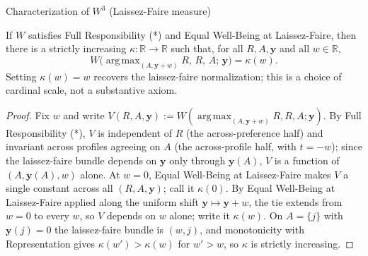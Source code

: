 \documentclass[10pt]{beamer}
\DeclareMathOperator*{\argmax}{arg\,max}
\begin{document}
\begin{frame}[allowframebreaks]{Characterization of $W^3$ (Laissez-Faire measure)}
\framebreak

\begin{lemma}
If $W$ satisfies Full Responsibility (*) and Equal Well-Being at Laissez-Faire,
then there is a strictly
increasing $\kappa:\mathbb R\to\mathbb R$ such that, for all $R,A,\mathbf y$ and
all $w\in\mathbb R$,
\begin{equation*}
W\!\big(\argmax_{(A,\mathbf y+w)}R,\,R,\,A;\,\mathbf y\big)=\kappa(w).
\end{equation*}
Setting $\kappa(w)=w$ recovers the laissez-faire normalization; this is a choice
of cardinal scale, not a substantive axiom.
\end{lemma}

\begin{proof}
Fix $w$ and write $V(R,A,\mathbf y):=W(\argmax_{(A,\mathbf y+w)}R,R,A;\mathbf
y)$. By Full Responsibility (*), $V$ is independent of $R$ (the across-preference
half) and invariant across profiles agreeing on $A$ (the across-profile half,
with $t=-w$); since the laissez-faire bundle depends on $\mathbf y$ only through
$\mathbf y(A)$, $V$ is a function of $(A,\mathbf y(A),w)$ alone. At $w=0$, Equal
Well-Being at Laissez-Faire makes $V$ a single constant across all
$(R,A,\mathbf y)$; call it $\kappa(0)$.
By Equal Well-Being at Laissez-Faire applied along the uniform shift
$\mathbf y\mapsto\mathbf y+w$, the tie extends from $w=0$ to every $w$, so $V$
depends on $w$ alone; write it $\kappa(w)$. On $A=\{j\}$ with $\mathbf y(j)=0$
the laissez-faire bundle is $(w,j)$, and monotonicity with Representation gives
$\kappa(w')>\kappa(w)$ for $w'>w$, so $\kappa$ is strictly increasing.
\end{proof}


\end{frame}
\end{document}
